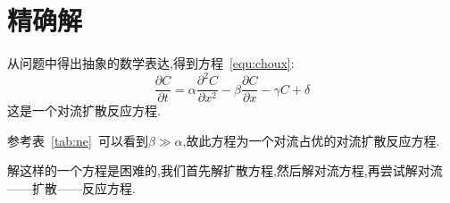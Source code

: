 \chapter{精确解}
从问题中得出抽象的数学表达,得到方程~\eqref{equ:choux}:
\begin{equation}\label{equ:choux}
	\dfrac{\partial C}{\partial t}= \alpha\dfrac{\partial^2 C}{\partial x^2}-\beta\dfrac{\partial C}{\partial x}-\gamma C + \delta
\end{equation}
这是一个对流扩散反应方程.\par
参考表~\ref{tab:ne}~可以看到$\beta\gg\alpha$,故此方程为一个对流占优的对流扩散反应方程.\par
解这样的一个方程是困难的,我们首先解扩散方程,然后解对流方程,再尝试解对流——扩散——反应方程.
